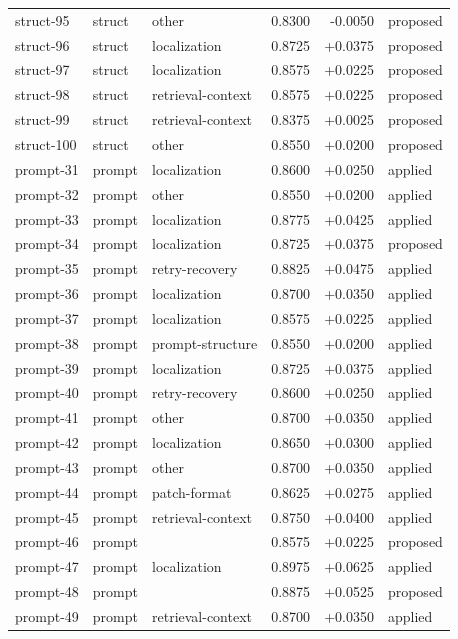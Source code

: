 \begin{center}
\begin{longtable}{llp{5.2cm}rrl}
struct-95 & struct & other & 0.8300 & -0.0050 & proposed \\
struct-96 & struct & localization & 0.8725 & +0.0375 & proposed \\
struct-97 & struct & localization & 0.8575 & +0.0225 & proposed \\
struct-98 & struct & retrieval-context & 0.8575 & +0.0225 & proposed \\
struct-99 & struct & retrieval-context & 0.8375 & +0.0025 & proposed \\
struct-100 & struct & other & 0.8550 & +0.0200 & proposed \\
prompt-31 & prompt & localization & 0.8600 & +0.0250 & applied \\
prompt-32 & prompt & other & 0.8550 & +0.0200 & applied \\
prompt-33 & prompt & localization & 0.8775 & +0.0425 & applied \\
prompt-34 & prompt & localization & 0.8725 & +0.0375 & proposed \\
prompt-35 & prompt & retry-recovery & 0.8825 & +0.0475 & applied \\
prompt-36 & prompt & localization & 0.8700 & +0.0350 & applied \\
prompt-37 & prompt & localization & 0.8575 & +0.0225 & applied \\
prompt-38 & prompt & prompt-structure & 0.8550 & +0.0200 & applied \\
prompt-39 & prompt & localization & 0.8725 & +0.0375 & applied \\
prompt-40 & prompt & retry-recovery & 0.8600 & +0.0250 & applied \\
prompt-41 & prompt & other & 0.8700 & +0.0350 & applied \\
prompt-42 & prompt & localization & 0.8650 & +0.0300 & applied \\
prompt-43 & prompt & other & 0.8700 & +0.0350 & applied \\
prompt-44 & prompt & patch-format & 0.8625 & +0.0275 & applied \\
prompt-45 & prompt & retrieval-context & 0.8750 & +0.0400 & applied \\
prompt-46 & prompt &  & 0.8575 & +0.0225 & proposed \\
prompt-47 & prompt & localization & 0.8975 & +0.0625 & applied \\
prompt-48 & prompt &  & 0.8875 & +0.0525 & proposed \\
prompt-49 & prompt & retrieval-context & 0.8700 & +0.0350 & applied \\

\end{longtable}
\end{center}

